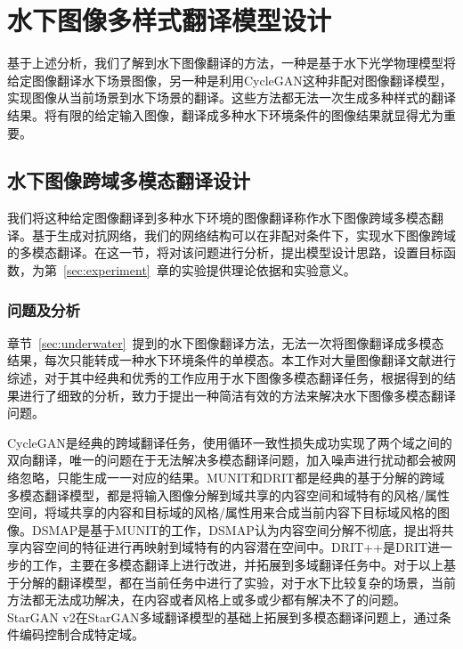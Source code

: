 \chapter{水下图像多样式翻译模型设计}
基于上述分析，我们了解到水下图像翻译的方法，一种是基于水下光学物理模型将给定图像翻译水下场景图像，另一种是利用CycleGAN这种非配对图像翻译模型，实现图像从当前场景到水下场景的翻译。这些方法都无法一次生成多种样式的翻译结果。将有限的给定输入图像，翻译成多种水下环境条件的图像结果就显得尤为重要。%

\section{水下图像跨域多模态翻译设计}
我们将这种给定图像翻译到多种水下环境的图像翻译称作水下图像跨域多模态翻译。基于生成对抗网络，我们的网络结构可以在非配对条件下，实现水下图像跨域的多模态翻译。在这一节，将对该问题进行分析，提出模型设计思路，设置目标函数，为第~\ref{sec:experiment}~章的实验提供理论依据和实验意义。

\subsection{问题及分析}
章节~\ref{sec:underwater}~提到的水下图像翻译方法，无法一次将图像翻译成多模态结果，每次只能转成一种水下环境条件的单模态。本工作对大量图像翻译文献进行综述，对于其中经典和优秀的工作应用于水下图像多模态翻译任务，根据得到的结果进行了细致的分析，致力于提出一种简洁有效的方法来解决水下图像多模态翻译问题。

CycleGAN是经典的跨域翻译任务，使用循环一致性损失成功实现了两个域之间的双向翻译，唯一的问题在于无法解决多模态翻译问题，加入噪声进行扰动都会被网络忽略，只能生成一一对应的结果。MUNIT和DRIT都是经典的基于分解的跨域多模态翻译模型，都是将输入图像分解到域共享的内容空间和域特有的风格/属性空间，将域共享的内容和目标域的风格/属性用来合成当前内容下目标域风格的图像。DSMAP是基于MUNIT的工作，DSMAP认为内容空间分解不彻底，提出将共享内容空间的特征进行再映射到域特有的内容潜在空间中。DRIT++是DRIT进一步的工作，主要在多模态翻译上进行改进，并拓展到多域翻译任务中。对于以上基于分解的翻译模型，都在当前任务中进行了实验，对于水下比较复杂的场景，当前方法都无法成功解决，在内容或者风格上或多或少都有解决不了的问题。StarGAN v2在StarGAN多域翻译模型的基础上拓展到多模态翻译问题上，通过条件编码控制合成特定域。


